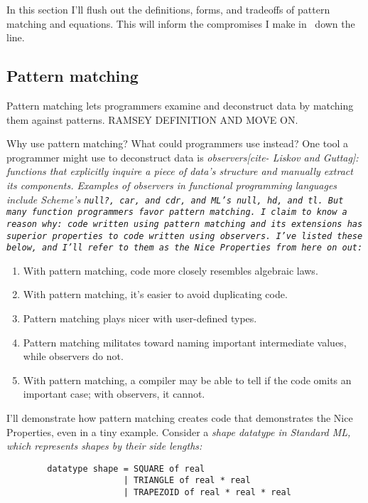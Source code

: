 \documentclass[manuscript,screen,review, 12pt, nonacm]{acmart}
\begin{document}
\begin{outline}[enumerate]
In this section I'll flush out the definitions, forms, and tradeoffs of pattern
matching and equations. This will inform the compromises I make in \VMinus\ down
the line. 

\subsection{Pattern matching}
\label{pmoverobservers}


Pattern matching lets programmers examine and deconstruct data by matching them
against patterns. RAMSEY DEFINITION AND MOVE ON. 

Why use pattern matching? What could programmers use instead? One tool a
programmer might use to deconstruct data is \it{observers}[cite- Liskov and
Guttag]: functions that explicitly inquire a piece of data's structure and
manually extract its components. Examples of observers in functional programming
languages include Scheme's \tt{null?}, \tt{car}, and \tt{cdr}, and ML's
\tt{null}, \tt{hd}, and \tt{tl}. But many function programmers favor pattern
matching. I claim to know a reason why: \it{code written using pattern matching
and its extensions has superior properties to code written using observers}.
I've listed these below, and I'll refer to them as the Nice Properties from here
on out: 

\begin{enumerate}
    \item With pattern matching, code more closely resembles algebraic laws. 
    \item With pattern matching, it's easier to avoid duplicating code.
    \item Pattern matching plays nicer with user-defined types. 
    \item Pattern matching militates toward naming important intermediate
    values, while observers do not. 
    \item With pattern matching, a compiler may be able to tell if the code
    omits an important case; with observers, it cannot. 
\end{enumerate}

I'll demonstrate how pattern matching creates code that demonstrates the Nice
Properties, even in a tiny example. Consider a \it{shape} datatype in Standard
ML, which represents shapes by their side lengths: 

\begin{minipage}[t]{\textwidth}
    \begin{verbatim}
        datatype shape = SQUARE of real 
                       | TRIANGLE of real * real 
                       | TRAPEZOID of real * real * real
\end{verbatim}
\end{minipage}


\end{outline}
\end{document}
